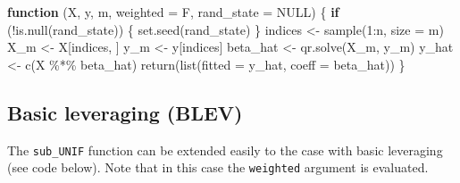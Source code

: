 \documentclass[
]{book}
\newenvironment{Shaded}{\begin{snugshade}}{\end{snugshade}}
\newcommand{\AttributeTok}[1]{\textcolor[rgb]{0.77,0.63,0.00}{#1}}
\newcommand{\ConstantTok}[1]{\textcolor[rgb]{0.00,0.00,0.00}{#1}}
\newcommand{\ControlFlowTok}[1]{\textcolor[rgb]{0.13,0.29,0.53}{\textbf{#1}}}
\newcommand{\DecValTok}[1]{\textcolor[rgb]{0.00,0.00,0.81}{#1}}
\newcommand{\FunctionTok}[1]{\textcolor[rgb]{0.00,0.00,0.00}{#1}}
\newcommand{\NormalTok}[1]{#1}
\newcommand{\OtherTok}[1]{\textcolor[rgb]{0.56,0.35,0.01}{#1}}
\newcommand{\SpecialCharTok}[1]{\textcolor[rgb]{0.00,0.00,0.00}{#1}}
\begin{document}
\begin{Shaded}
\begin{Highlighting}[]
\ControlFlowTok{function}\NormalTok{ (X, y, m, }\AttributeTok{weighted =}\NormalTok{ F, }\AttributeTok{rand\_state =} \ConstantTok{NULL}\NormalTok{) }
\NormalTok{\{}
    \ControlFlowTok{if}\NormalTok{ (}\SpecialCharTok{!}\FunctionTok{is.null}\NormalTok{(rand\_state)) \{}
        \FunctionTok{set.seed}\NormalTok{(rand\_state)}
\NormalTok{    \}}
\NormalTok{    indices }\OtherTok{\textless{}{-}} \FunctionTok{sample}\NormalTok{(}\DecValTok{1}\SpecialCharTok{:}\NormalTok{n, }\AttributeTok{size =}\NormalTok{ m)}
\NormalTok{    X\_m }\OtherTok{\textless{}{-}}\NormalTok{ X[indices, ]}
\NormalTok{    y\_m }\OtherTok{\textless{}{-}}\NormalTok{ y[indices]}
\NormalTok{    beta\_hat }\OtherTok{\textless{}{-}} \FunctionTok{qr.solve}\NormalTok{(X\_m, y\_m)}
\NormalTok{    y\_hat }\OtherTok{\textless{}{-}} \FunctionTok{c}\NormalTok{(X }\SpecialCharTok{\%*\%}\NormalTok{ beta\_hat)}
    \FunctionTok{return}\NormalTok{(}\FunctionTok{list}\NormalTok{(}\AttributeTok{fitted =}\NormalTok{ y\_hat, }\AttributeTok{coeff =}\NormalTok{ beta\_hat))}
\NormalTok{\}}
\end{Highlighting}
\end{Shaded}

\hypertarget{basic-leveraging-blev}{%
\subsection{Basic leveraging (BLEV)}\label{basic-leveraging-blev}}

The \texttt{sub\_UNIF} function can be extended easily to the case with basic leveraging (see code below). Note that in this case the \texttt{weighted} argument is evaluated.
\end{document}
